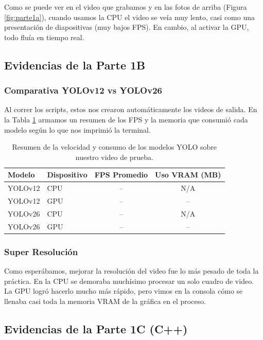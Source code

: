 \documentclass[12pt]{article}
\begin{document}
Como se puede ver en el video que grabamos y en las fotos de arriba (Figura \ref{fig:parte1a}), cuando usamos la CPU el video se veía muy lento, casi como una presentación de diapositivas (muy bajos FPS). En cambio, al activar la GPU, todo fluía en tiempo real. 

\subsection{Evidencias de la Parte 1B}

\subsubsection{Comparativa YOLOv12 vs YOLOv26}
Al correr los scripts, estos nos crearon automáticamente los videos de salida. En la Tabla \ref{tab:yolo_bench} armamos un resumen de los FPS y la memoria que consumió cada modelo según lo que nos imprimió la terminal.

\begin{table}[H]
    \centering
    \begin{tabular}{llcc}
    \toprule
    \textbf{Modelo} & \textbf{Dispositivo} & \textbf{FPS Promedio} & \textbf{Uso VRAM (MB)} \\
    \midrule
    YOLOv12 & CPU & -- & N/A \\ %
    YOLOv12 & GPU & -- & -- \\
    YOLOv26 & CPU & -- & N/A \\
    YOLOv26 & GPU & -- & -- \\
    \bottomrule
    \end{tabular}
    \caption{Resumen de la velocidad y consumo de los modelos YOLO sobre nuestro video de prueba.}
    \label{tab:yolo_bench}
\end{table}

\subsubsection{Super Resolución}
Como esperábamos, mejorar la resolución del video fue lo más pesado de toda la práctica. En la CPU se demoraba muchísimo procesar un solo cuadro de video. La GPU logró hacerlo mucho más rápido, pero vimos en la consola cómo se llenaba casi toda la memoria VRAM de la gráfica en el proceso.

\subsection{Evidencias de la Parte 1C (C++)}
\end{document}
